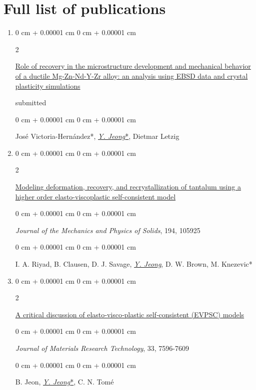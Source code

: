 \documentclass[10pt, letterpaper]{article}
\newenvironment{onecolentry}{
    \begin{adjustwidth}{
        0 cm + 0.00001 cm
    }{
        0 cm + 0.00001 cm
    }
}{
    \end{adjustwidth}
} %
\newenvironment{twocolentry}[2][]{
    \onecolentry
    \def\secondColumn{#2}
    \setcolumnwidth{\fill, 4.5 cm}
    \begin{paracol}{2}
}{
    \switchcolumn \raggedleft \secondColumn
    \end{paracol}
    \endonecolentry
} %
\begin{document}
        \section{Full list of publications}
        \begin{enumerate}
        \item
          \begin{twocolentry}{submitted}
            \href{}{Role of recovery in the microstructure development and mechanical behavior of a ductile Mg-Zn-Nd-Y-Zr alloy: an analysis using EBSD data and crystal plasticity simulations}
        \end{twocolentry}
        \begin{onecolentry}
            José Victoria-Hernández*, {\underline{\textit{Y. Jeong}*}}, Dietmar Letzig
        \end{onecolentry}
        \vspace{0.10 cm}


        \item
        \begin{twocolentry}{2025}
            \href{https://doi.org/10.1016/j.jmps.2024.105925}{Modeling deformation, recovery, and recrystallization of tantalum using a higher order elasto-viscoplastic self-consistent model}
        \end{twocolentry}
        \begin{onecolentry}
            {\it Journal of the Mechanics and Physics of Solids}, 194, 105925
        \end{onecolentry}
        \begin{onecolentry}
            I. A. Riyad, B. Clausen, D. J. Savage, {\underline{\textit{Y. Jeong}}}, D. W. Brown, M. Knezevic*
        \end{onecolentry}
        \vspace{0.10 cm}

        \item
        \begin{twocolentry}{2024}
            \href{https://doi.org/10.1016/j.jmrt.2024.11.043}{A critical discussion of elasto‑visco‑plastic self‑consistent (EVPSC) models}
        \end{twocolentry}
        \begin{onecolentry}
            {\it Journal of Materials Research Technology}, 33, 7596-7609
        \end{onecolentry}
        \begin{onecolentry}
            B. Jeon, {\underline{\textit{Y. Jeong}*}}, C. N. Tomé
        \end{onecolentry}
        \vspace{0.10 cm}


\end{enumerate}
\end{document}
